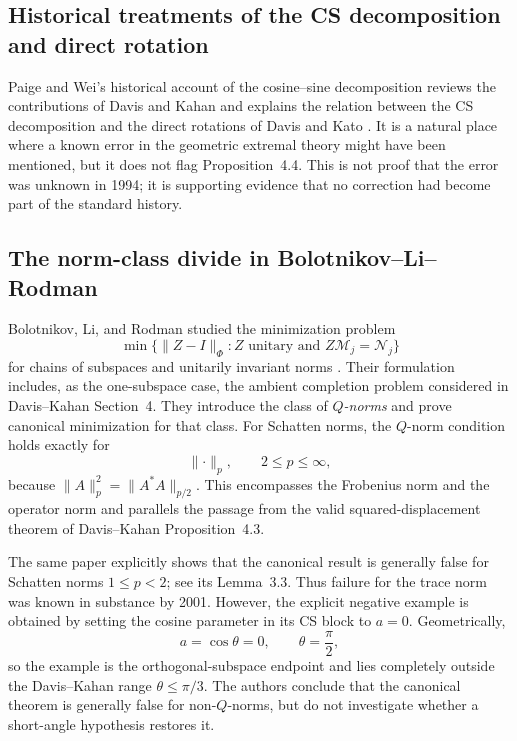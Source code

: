 \documentclass[11pt]{article}
\begin{document}
\subsection{Historical treatments of the CS decomposition and direct rotation}

Paige and Wei's historical account of the cosine--sine decomposition reviews
the contributions of Davis and Kahan and explains the relation between the CS
decomposition and the direct rotations of Davis and Kato
\cite{PaigeWei1994}.  It is a natural place where a known error in the geometric
extremal theory might have been mentioned, but it does not flag
Proposition~4.4.  This is not proof that the error was unknown in 1994; it is
supporting evidence that no correction had become part of the standard history.

\subsection{The norm-class divide in Bolotnikov--Li--Rodman}

Bolotnikov, Li, and Rodman studied the minimization problem
\[
 \min\{\lVert Z-I\rVert_\Phi:
       Z\text{ unitary and }Z\mathcal M_j=\mathcal N_j\}
\]
for chains of subspaces and unitarily invariant norms
\cite{BolotnikovLiRodman2001}.  Their formulation includes, as the one-subspace
case, the ambient completion problem considered in Davis--Kahan Section~4.
They introduce the class of \emph{$Q$-norms} and prove canonical minimization
for that class.  For Schatten norms, the $Q$-norm condition holds exactly for
\[
  \lVert\cdot\rVert_p,\qquad 2\leq p\leq\infty,
\]
because $\lVert A\rVert_p^2=\lVert A^*A\rVert_{p/2}$.  This encompasses the
Frobenius norm and the operator norm and parallels the passage from the valid
squared-displacement theorem of Davis--Kahan Proposition~4.3.

The same paper explicitly shows that the canonical result is generally false
for Schatten norms $1\leq p<2$; see its Lemma~3.3.  Thus failure for the trace
norm was known in substance by 2001.  However, the explicit negative example is
obtained by setting the cosine parameter in its CS block to $a=0$.
Geometrically,
\[
 a=\cos\theta=0,
 \qquad \theta=\frac\pi2,
\]
so the example is the orthogonal-subspace endpoint and lies completely outside
the Davis--Kahan range $\theta\leq\pi/3$.  The authors conclude that the
canonical theorem is generally false for non-$Q$-norms, but do not investigate
whether a short-angle hypothesis restores it.
\end{document}
